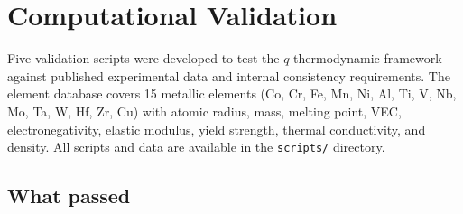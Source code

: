 \documentclass[12pt,letterpaper]{article}
\theoremstyle{definition}
\begin{document}
\section{Computational Validation}\label{sec:validation}

Five validation scripts were developed to test the $q$-thermodynamic framework against published experimental data and internal consistency requirements.  The element database covers 15 metallic elements (Co, Cr, Fe, Mn, Ni, Al, Ti, V, Nb, Mo, Ta, W, Hf, Zr, Cu) with atomic radius, mass, melting point, VEC, electronegativity, elastic modulus, yield strength, thermal conductivity, and density.  All scripts and data are available in the \texttt{scripts/} directory.

\subsection{What passed}
\end{document}
